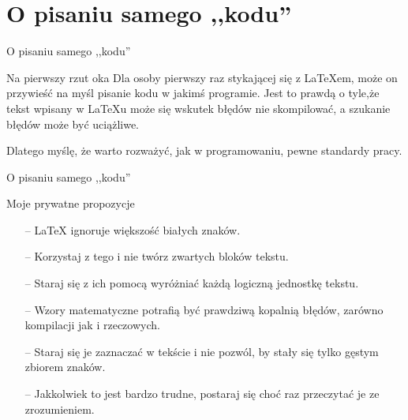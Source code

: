 \documentclass{beamer}
\newcommand{\ad}{\textrm{ad}}
\begin{document}
\section{O pisaniu samego ,,kodu''}


\begin{frame}{O pisaniu samego ,,kodu''}
\pause

\begin{block}{Na pierwszy rzut oka}
Dla osoby pierwszy raz stykającej się z \LaTeX em, może on przywieść na myśl pisanie kodu w jakimś programie. Jest to
prawdą o tyle,\linebreak że tekst wpisany w \LaTeX u może się wskutek błędów nie skompilować, a szukanie błędów może być
uciążliwe. 
\end{block}

\begin{block}{}
Dlatego myślę, że warto rozważyć, jak w programowaniu, pewne standardy pracy.
\end{block}

\end{frame}



\begin{frame}{O pisaniu samego ,,kodu''}
\pause

\begin{block}{Moje prywatne propozycje}

\begin{itemize}
\pause
\item[--] \LaTeX { }ignoruje większość białych znaków.
\pause
\item[--] Korzystaj z tego i nie twórz zwartych bloków tekstu.
\pause
\item[--] Staraj się z ich pomocą wyróżniać każdą logiczną jednostkę tekstu.
\pause
\item[--] Wzory matematyczne potrafią być prawdziwą kopalnią błędów, zarówno kompilacji jak i rzeczowych. 
\pause
\item[--]Staraj się je zaznaczać w tekście i nie pozwól, by stały się tylko gęstym zbiorem znaków.
\pause
\item[--] Jakkolwiek to jest bardzo trudne, postaraj się choć raz przeczytać je ze zrozumieniem.
\end{itemize}

\end{block}

\end{frame}



%
%
%
\end{document}
